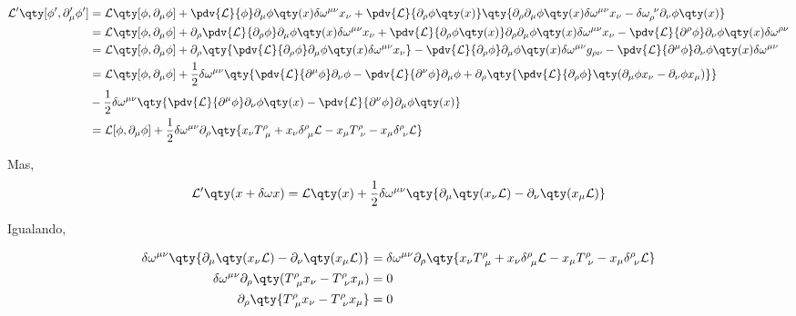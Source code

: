 \documentclass[twoside]{amsart}
\numberwithin{equation}{section}
\begin{document}
\begin{refsection}
\begin{align}
    \mathcal L'\qty[\phi',\partial_\mu'\phi']&=\mathcal L\qty[\phi,\partial_\mu\phi]+\pdv{\mathcal L}{\phi}\partial_\mu\phi\qty(x)\delta\omega^{\mu\nu}x_\nu+\pdv{\mathcal L}{\partial_\rho\phi\qty(x)}\qty{\partial_\rho\partial_\mu\phi\qty(x)\delta\omega^{\mu\nu}x_\nu-\delta\omega_{\rho}^{\ \nu}\partial_\nu\phi\qty(x)}\\
    &=\mathcal L\qty[\phi,\partial_\mu\phi]+\partial_\rho\pdv{\mathcal L}{\partial_\rho\phi}\partial_\mu\phi\qty(x)\delta\omega^{\mu\nu}x_\nu+\pdv{\mathcal L}{\partial_\rho\phi\qty(x)}\partial_\rho\partial_\mu\phi\qty(x)\delta\omega^{\mu\nu}x_\nu-\pdv{\mathcal L}{\partial^\rho\phi}\partial_\nu\phi\qty(x)\delta\omega^{\rho\nu}\\
    &=\mathcal L\qty[\phi,\partial_\mu\phi]+\partial_\rho\qty{\pdv{\mathcal L}{\partial_\rho\phi}\partial_\mu\phi\qty(x)\delta\omega^{\mu\nu}x_\nu}-\pdv{\mathcal L}{\partial_\rho\phi}\partial_\mu\phi\qty(x)\delta\omega^{\mu\nu}g_{\rho\nu}-\pdv{\mathcal L}{\partial^\mu\phi}\partial_\nu\phi\qty(x)\delta\omega^{\mu\nu}\\
    &=\mathcal L\qty[\phi,\partial_\mu\phi]+\frac12\delta\omega^{\mu\nu}\qty{\pdv{\mathcal L}{\partial^\mu\phi}\partial_\nu\phi-\pdv{\mathcal L}{\partial^\nu\phi}\partial_\mu\phi+\partial_\rho\qty{\pdv{\mathcal L}{\partial_\rho\phi}\qty(\partial_\mu\phi x_\nu-\partial_\nu\phi x_\mu)}}\\
    &-\frac12\delta\omega^{\mu\nu}\qty{\pdv{\mathcal L}{\partial^\mu\phi}\partial_\nu\phi\qty(x)-\pdv{\mathcal L}{\partial^\nu\phi}\partial_\mu\phi\qty(x)}\\
    &=\mathcal L[\phi,\partial_\mu\phi]+\frac12\delta\omega^{\mu\nu}\partial_\rho\qty{x_\nu T^\rho_{\ \mu}+x_\nu\delta^\rho_{\ \mu}\mathcal L-x_\mu T^\rho_{\ \nu}-x_\mu\delta^\rho_{\ \nu}\mathcal L}
\end{align}

Mas, $$\mathcal L'\qty(x+\delta\omega x)=\mathcal L\qty(x)+\frac12\delta\omega^{\mu\nu}\qty{\partial_\mu\qty(x_\nu\mathcal L)-\partial_\nu\qty(x_\mu\mathcal L)}$$

Igualando,

\begin{align}
    \delta\omega^{\mu\nu}\qty{\partial_\mu\qty(x_\nu\mathcal L)-\partial_\nu\qty(x_\mu\mathcal L)}&=\delta\omega^{\mu\nu}\partial_\rho\qty{x_\nu T^\rho_{\ \mu}+x_\nu\delta^\rho_{\ \mu}\mathcal L-x_\mu T^\rho_{\ \nu}-x_\mu\delta^\rho_{\ \nu}\mathcal L}\\
    \delta\omega^{\mu\nu}\partial_\rho\qty(T^\rho_{\ \mu}x_\nu-T^\rho_{\ \nu}x_\mu)&=0\\
    \partial_\rho\qty{T^\rho_{\ \mu}x_\nu-T^\rho_{\ \nu}x_\mu}&=0
\end{align}


\end{refsection}
\end{document}
